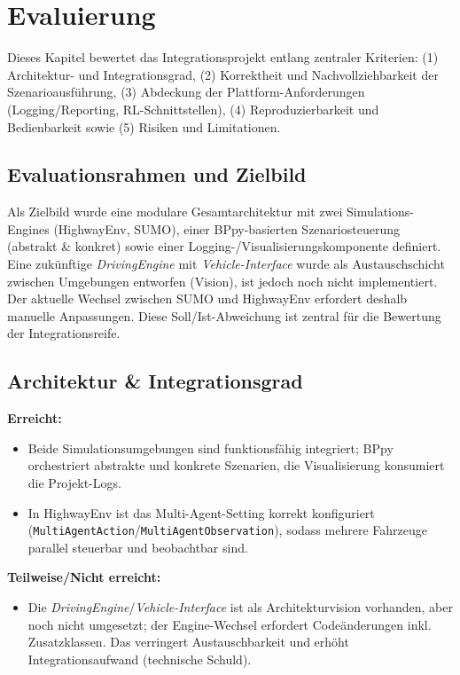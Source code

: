 \chapter{Evaluierung}
\label{chap:evaluierung}

Dieses Kapitel bewertet das Integrationsprojekt entlang zentraler Kriterien:
(1) Architektur- und Integrationsgrad,
(2) Korrektheit und Nachvollziehbarkeit der Szenarioausführung,
(3) Abdeckung der Plattform-Anforderungen (Logging/Reporting, RL-Schnittstellen),
(4) Reproduzierbarkeit und Bedienbarkeit sowie
(5) Risiken und Limitationen.

\section{Evaluationsrahmen und Zielbild}
Als Zielbild wurde eine modulare Gesamtarchitektur mit zwei Simulations-Engines (HighwayEnv, SUMO), einer BPpy-basierten Szenariosteuerung (abstrakt \& konkret) sowie einer Logging-/Visualisierungskomponente definiert.
Eine zukünftige \emph{DrivingEngine} mit \emph{Vehicle-Interface} wurde als Austauschschicht zwischen Umgebungen entworfen (Vision), ist jedoch noch nicht implementiert.
Der aktuelle Wechsel zwischen SUMO und HighwayEnv erfordert deshalb manuelle Anpassungen.
Diese Soll/Ist-Abweichung ist zentral für die Bewertung der Integrationsreife.

\section{Architektur \& Integrationsgrad}
\textbf{Erreicht:}
\begin{itemize}
  \item Beide Simulationsumgebungen sind funktionsfähig integriert; BPpy orchestriert abstrakte und konkrete Szenarien, die Visualisierung konsumiert die Projekt-Logs.
  \item In HighwayEnv ist das Multi-Agent-Setting korrekt konfiguriert (\texttt{MultiAgentAction}/\texttt{MultiAgentObservation}), sodass mehrere Fahrzeuge parallel steuerbar und beobachtbar sind.
\end{itemize}
\clearpage
\noindent\textbf{Teilweise/Nicht erreicht:}
\begin{itemize}
  \item Die \emph{DrivingEngine}/\emph{Vehicle-Interface} ist als Architekturvision vorhanden, aber noch nicht umgesetzt; der Engine-Wechsel erfordert Codeänderungen inkl. Zusatzklassen. Das verringert Austauschbarkeit und erhöht Integrationsaufwand (technische Schuld).
\end{itemize}


